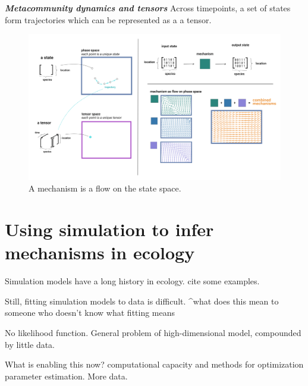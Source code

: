 \documentclass[10pt,oneside]{article}
\makeatletter
\def\maxwidth{\ifdim\Gin@nat@width>\linewidth\linewidth
\else\Gin@nat@width\fi}
\let\Oldincludegraphics\includegraphics
\renewcommand{\includegraphics}[1]{\Oldincludegraphics[width=\maxwidth]{#1}}
\makeatother
\begin{document}
\textbf{\emph{Metacommunity dynamics and tensors}} Across timepoints, a
set of states form trajectories which can be represented as a a tensor.

\begin{figure}
\hypertarget{fig:flow}{%
\centering
\includegraphics{./figures/flows.png}
\caption{A mechanism is a flow on the state space.}\label{fig:flow}
}
\end{figure}

\hypertarget{using-simulation-to-infer-mechanisms-in-ecology}{%
\section{Using simulation to infer mechanisms in
ecology}\label{using-simulation-to-infer-mechanisms-in-ecology}}

Simulation models have a long history in ecology. cite some examples.

Still, fitting simulation models to data is difficult. \^{}what does
this mean to someone who doesn't know what fitting means

No likelihood function. General problem of high-dimensional model,
compounded by little data.

What is enabling this now? computational capacity and methods for
optimization parameter estimation. More data.
\end{document}
